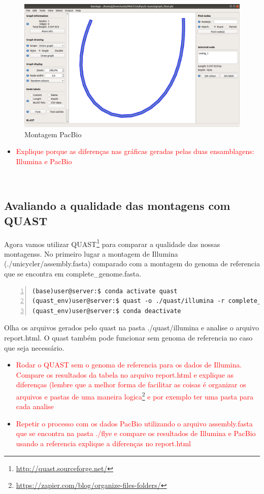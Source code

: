 \documentclass[letter,11pt]{book}
\begin{document}
\begin{figure}[ht]
\centering
   \includegraphics[width=12cm]{Figs/bandage_pacbio.png}
  \caption[Visualização da montagem do flye]{\label{bandage_pacbio}Montagem PacBio}
\end{figure}

\begin{itemize}
\item \textcolor{red}{Explique porque as diferenças nas gráficas geradas pelas duas ensamblagens: Illumina e PacBio}
\end{itemize}\


\subsection{Avaliando a qualidade das montagens com QUAST}
Agora vamos utilizar QUAST\footnote{\url{http://quast.sourceforge.net/}} para comparar a qualidade das nossas montagenss. No primeiro lugar a montagem de Illumina (./unicycler/assembly.fasta) comparado com a montagem do genoma de referencia que se encontra em complete\_genome.fasta.

\begin{Verbatim}[commandchars=!\{\}, numbers=left,label= QUAST,frame=topline,fontsize=\scriptsize]
(base)user@server:$ conda activate quast
(quast_env)user@server:$ quast -o ./quast/illumina -r complete_genome.fasta ./unicycler/assembly.fasta
(quast_env)user@server:$ conda deactivate
\end{Verbatim}

Olha os arquivos gerados pelo quast na pasta ./quast/illumina e analise o arquivo report.html.
O quast também pode funcionar sem genoma de referencia no caso que seja necessário.

\begin{itemize}
\item \textcolor{red}{Rodar o QUAST sem o genoma de referencia para os dados de Illumina. Compare os resultados da tabela no arquivo report.html e explique as diferenças} \textcolor{red} {(lembre que a melhor forma de  facilitar as coisas é organizar os arquivos e pastas de uma maneira logica\footnote{\url{https://zapier.com/blog/organize-files-folders/}}  e por exemplo ter uma pasta para cada analise}
\item \textcolor{red}{Repetir o processo com os dados PacBio utilizando o arquivo assembly.fasta que se encontra na pasta ./flye e compare os resultados de Illumina e PacBio usando a referencia explique a diferenças no report.html}
\end{itemize}
\end{document}
